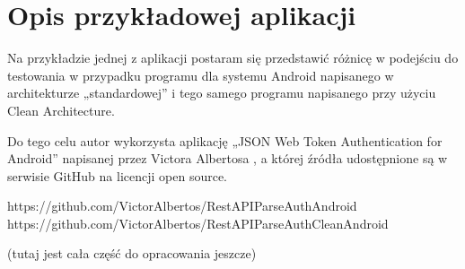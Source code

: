 \chapter{Opis przykładowej aplikacji}

Na przykładzie jednej z aplikacji postaram się przedstawić różnicę w podejściu do testowania w przypadku programu dla systemu Android napisanego w architekturze „standardowej” i tego samego programu napisanego przy użyciu Clean Architecture.

Do tego celu autor wykorzysta aplikację „JSON Web Token Authentication for Android” napisanej przez Victora Albertosa , a której źródła udostępnione są w serwisie GitHub na licencji open source.

https://github.com/VictorAlbertos/RestAPIParseAuthAndroid
https://github.com/VictorAlbertos/RestAPIParseAuthCleanAndroid

(tutaj jest cała część do opracowania jeszcze)
